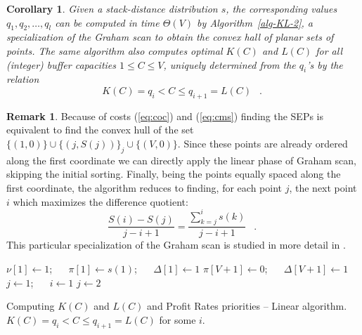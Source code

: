 \documentclass[11pt,a4paper]{article}
\DeclareMathOperator{\mf}{\enspace .}
\newtheorem{corollary}{Corollary}
\theoremstyle{definition}
\newtheorem{remark}{Remark}
\theoremstyle{remark}
\begin{document}
\begin{corollary}\label{thm-KL-2-comp}
  Given a stack-distance distribution $s$, the corresponding values $q_1,q_2,
  \ldots, q_l$ can be computed in time \(\Theta(V)\) by
  Algorithm~\ref{alg-KL-2}, a specialization of the Graham scan \cite{Graham72}
  to obtain the convex hall of planar sets of points.  The same algorithm also
  computes optimal \(K(C)\) and \(L(C)\) for all (integer) buffer capacities $1
  \leq C \leq V$, uniquely determined from the $q_i$'s by the relation
\begin{equation}
  K(C)=q_i < C \leq q_{i+1}=L(C) \mf
\end{equation}
\end{corollary}
\begin{remark}
  Because of costs (\ref{eq:coc}) and (\ref{eq:cms}) finding the SEPs is
  equivalent to find the convex hull of the set $\{(1,0)\} \cup \{(j, S(j))\}_j
  \cup \{(V,0)\}$. Since these points are already ordered along the first
  coordinate we can directly apply the linear phase of Graham scan, skipping the
  initial sorting. Finally, being the points equally spaced along the first
  coordinate, the algorithm reduces to finding, for each point $j$, the next point $i$
  which maximizes the difference quotient:
  \begin{equation}
    \frac{S(i)-S(j)}{j-i+1} = \frac{\sum_{k=j}^i s(k)}{j-i+1} \mf
  \end{equation}
  This particular specialization of the Graham scan is studied in more detail in
  \cite{BernholtEH07,LinJC02}.
\end{remark}
\begin{algorithm}[H]
  $\nu[1] \leftarrow 1$; $\quad$
  $\pi[1] \leftarrow s(1)$; $\quad$
  $\Delta[1] \leftarrow 1$\;
  $\pi[V+1] \leftarrow 0$; $\quad$
  $\Delta[V+1] \leftarrow 1$\;
  $j \leftarrow 1$; $\quad$
  $i \leftarrow 1$\;
  $j \leftarrow 2$\;
  \caption{Computing \(K(C)\) and \(L(C)\) and Profit Rates priorities -- Linear
    algorithm. $K(C)=q_i < C \leq q_{i+1}=L(C)$ for some $i$.}
  \label{alg-KL-2}
\end{algorithm}
\end{document}
